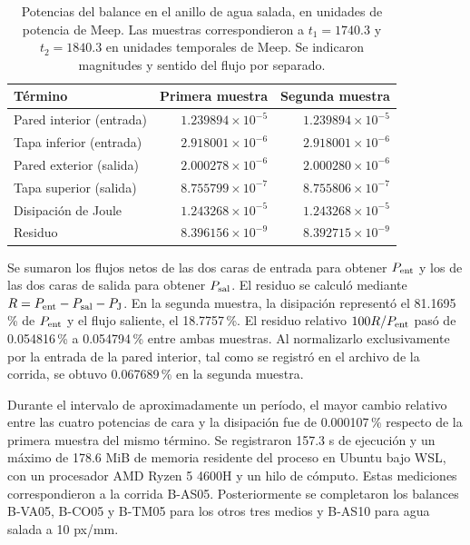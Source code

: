 \begin{table}[htbp]\centering\small
\caption{Potencias del balance en el anillo de agua salada, en unidades de potencia de Meep. Las muestras correspondieron a $t_1=1740.3$ y $t_2=1840.3$ en unidades temporales de Meep. Se indicaron magnitudes y sentido del flujo por separado.}\label{tab:balance-agua-cinco}
\begin{tabular}{lrr}\hline
Término & Primera muestra & Segunda muestra \\ \hline
Pared interior (entrada) & $1.239894\times10^{-5}$ & $1.239894\times10^{-5}$ \\
Tapa inferior (entrada) & $2.918001\times10^{-6}$ & $2.918001\times10^{-6}$ \\
Pared exterior (salida) & $2.000278\times10^{-6}$ & $2.000280\times10^{-6}$ \\
Tapa superior (salida) & $8.755799\times10^{-7}$ & $8.755806\times10^{-7}$ \\
Disipación de Joule & $1.243268\times10^{-5}$ & $1.243268\times10^{-5}$ \\
Residuo & $8.396156\times10^{-9}$ & $8.392715\times10^{-9}$ \\ \hline
\end{tabular}\end{table}

Se sumaron los flujos netos de las dos caras de entrada para obtener $P_{\rm ent}$ y los de las dos caras de salida para obtener $P_{\rm sal}$. El residuo se calculó mediante $R=P_{\rm ent}-P_{\rm sal}-P_{\rm J}$. En la segunda muestra, la disipación representó el 81.1695\,\% de $P_{\rm ent}$ y el flujo saliente, el 18.7757\,\%. El residuo relativo $100R/P_{\rm ent}$ pasó de 0.054816\,\% a 0.054794\,\% entre ambas muestras. Al normalizarlo exclusivamente por la entrada de la pared interior, tal como se registró en el archivo de la corrida, se obtuvo 0.067689\,\% en la segunda muestra.

Durante el intervalo de aproximadamente un período, el mayor cambio relativo entre las cuatro potencias de cara y la disipación fue de 0.000107\,\% respecto de la primera muestra del mismo término. Se registraron 157.3 s de ejecución y un máximo de 178.6 MiB de memoria residente del proceso en Ubuntu bajo WSL, con un procesador AMD Ryzen 5 4600H y un hilo de cómputo. Estas mediciones correspondieron a la corrida B-AS05. Posteriormente se completaron los balances B-VA05, B-CO05 y B-TM05 para los otros tres medios y B-AS10 para agua salada a 10 px/mm.

